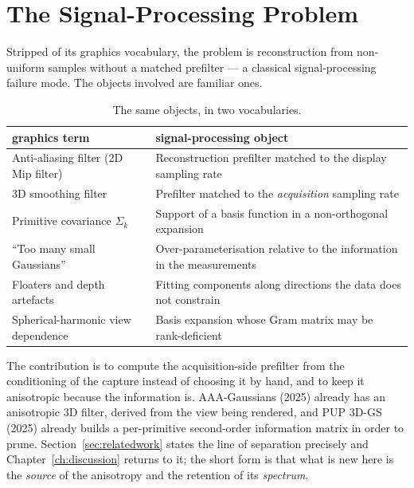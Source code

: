 
\section{The Signal-Processing Problem}

Stripped of its graphics vocabulary, the problem is reconstruction from
non-uniform samples without a matched prefilter --- a classical
signal-processing failure mode. The objects involved are familiar ones.

\begin{table}[htbp]
  \centering
  \caption{The same objects, in two vocabularies.}
  \small
  \begin{tabularx}{\linewidth}{L{0.91}L{1.09}}
    \toprule
    graphics term & signal-processing object \\
    \midrule
    Anti-aliasing filter (2D Mip filter) & Reconstruction prefilter matched to the display sampling rate \\
    3D smoothing filter & Prefilter matched to the \emph{acquisition} sampling rate \\
    Primitive covariance $\Sigma_k$ & Support of a basis function in a non-orthogonal expansion \\
    ``Too many small Gaussians'' & Over-parameterisation relative to the information in the measurements \\
    Floaters and depth artefacts & Fitting components along directions the data does not constrain \\
    Spherical-harmonic view dependence & Basis expansion whose Gram matrix may be rank-deficient \\
    \bottomrule
  \end{tabularx}
\end{table}

The contribution is to compute the acquisition-side prefilter from the conditioning of the capture instead of choosing it by hand, and to keep it anisotropic
because the information is. AAA-Gaussians (2025) already has an anisotropic 3D filter, derived from the view
being rendered, and PUP 3D-GS (2025) already builds a per-primitive second-order
information matrix in order to prune. Section~\ref{sec:relatedwork} states the line of
separation precisely and Chapter~\ref{ch:discussion} returns to it; the short
form is that what is new here is the \emph{source} of the anisotropy and the
retention of its \emph{spectrum}.

